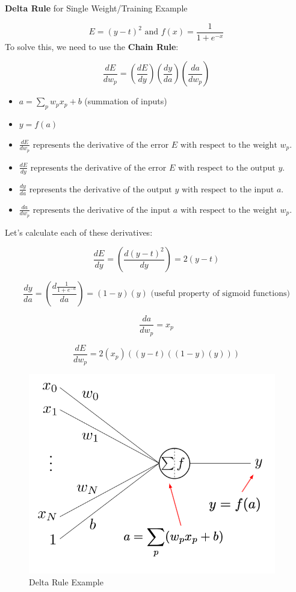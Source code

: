 \begin{example}
\textbf{Delta Rule} for Single Weight/Training Example


\[E = (y - t)^2  \text{  and  } f(x) = \frac{1}{1+e^{-x}}\]
To solve this, we need to use the \textbf{Chain Rule}:


\[ \frac{dE}{dw_p} = (\frac{dE}{dy}) (\frac{dy}{da}) (\frac{da}{dw_p}) \]
\begin{itemize}
    \item \(a = \sum_{p} w_p x_p + b\)    (summation of inputs)
    \item \(y = f(a)\)
    \item \(\frac{dE}{dw_p} \text{ represents the derivative of the error } E \text{ with respect to the weight } w_p.\)
    \item \(\frac{dE}{dy} \text{ represents the derivative of the error } E \text{ with respect to the output } y.\)
    \item \(\frac{dy}{da} \text{ represents the derivative of the output } y \text{ with respect to the input } a.\)
    \item \(\frac{da}{dw_p} \text{ represents the derivative of the input } a \text{ with respect to the weight } w_p.\)\\
\end{itemize}

Let's calculate each of these derivatives:


\[\frac{dE}{dy} = (\frac{d(y-t)^2}{dy}) = 2(y-t)\]


\[\frac{dy}{da} = (\frac{d{\frac{1}{1+e^{-a}}}}{da}) = (1-y)(y) \text{   (useful property of sigmoid functions)}\]

\[\frac{da}{dw_p} = x_p\]


\[\frac{dE}{dw_p} = 2(x_p)((y-t)((1-y)(y)))\]
\end{example}

\begin{figure}[h!t]
    \centering
    \includegraphics[width=0.4\linewidth]{deltaruleexample.png}
    \caption{Delta Rule Example}
    \label{fig:enter-label}
\end{figure}

